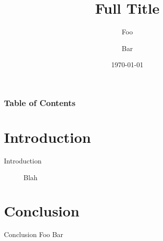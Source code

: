 \documentclass{fatslides}
\title[Short Title]{Full Title}
\author[Short Author]{Foo \and Bar}
\date[\today]{\today}
\begin{document}
\frame{\titlepage}

\begin{frame}
    \frametitle{Table of Contents}
    \tableofcontents
\end{frame}

\section{Introduction}

\begin{frame}{Introduction}
\begin{figure}[H]
    \centering
	Blah 
\end{figure}
\end{frame}

\section{Conclusion}

\begin{frame}{Conclusion}
	Foo \pause
	Bar
\end{frame}


\end{document}
